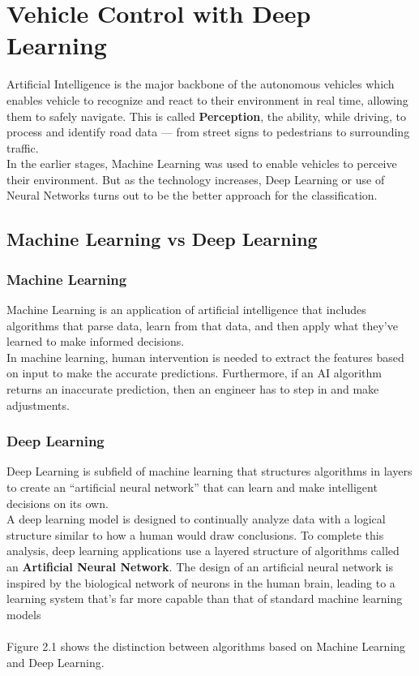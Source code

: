 \section{Vehicle Control with Deep Learning}
Artificial Intelligence is the major backbone of the autonomous vehicles which enables vehicle to recognize and react to their environment in real time, allowing them to safely navigate. This is called \textbf{Perception}, the ability, while driving, to process and identify road data — from street signs to pedestrians to surrounding traffic.
\\
In the earlier stages, Machine Learning was used to enable vehicles to perceive their environment. But as the technology increases, Deep Learning or use of Neural Networks turns out to be the better approach for the classification.

\subsection{Machine Learning vs Deep Learning}
\subsubsection{Machine Learning}
Machine Learning is an application of artificial intelligence that includes algorithms that parse data, learn from that data, and then apply what they've learned to make informed decisions.
\\
In machine learning, human intervention is needed to extract the features based on input to make the accurate predictions. Furthermore, if an AI algorithm returns an inaccurate prediction, then an engineer has to step in and make adjustments.

\subsubsection{Deep Learning}
Deep Learning is subfield of machine learning that structures algorithms in layers to create an “artificial neural network” that can learn and make intelligent decisions on its own.
\\
A deep learning model is designed to continually analyze data with a logical structure similar to how a human would draw conclusions. To complete this analysis, deep learning applications use a layered structure of algorithms called an \textbf{Artificial Neural Network}. The design of an artificial neural network is inspired by the biological network of neurons in the human brain, leading to a learning system that's far more capable than that of standard machine learning models
\\
\\
Figure 2.1 shows the distinction between algorithms based on Machine Learning and Deep Learning.

